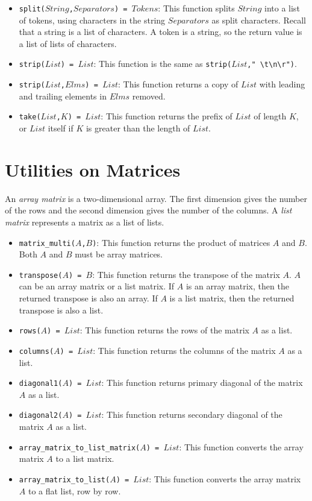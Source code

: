 \begin{itemize}
\item \texttt{split($String$,$Separators$) = $Tokens$}: This function splits $String$ into a list of tokens, using characters in the string $Separators$ as split characters. Recall that a string is a list of characters. A token is a string, so the return value is a list of lists of characters.
\item \texttt{strip($List$) = $List$}: This function is the same as \texttt{strip($List$,}\verb+" \t\n\r")+. 
\item \texttt{strip($List$,$Elms$) = $List$}: This function returns a copy of $List$ with leading and trailing elements in $Elms$ removed.
\item \texttt{take($List$,$K$) = $List$}: This function returns the prefix of $List$ of length $K$, or $List$ itself if $K$ is greater than the length of $List$.
\end{itemize}

\section{Utilities on Matrices}
An {\it array matrix} is a two-dimensional array. The first dimension gives the number of the rows and the second dimension gives the number of the columns. A {\it list matrix} represents a matrix as a list of lists.

\begin{itemize}
\item \texttt{matrix\_multi($A$,$B$)}: This function returns the product of matrices $A$ and $B$. Both $A$ and $B$ must be array matrices.
\item \texttt{transpose($A$) = $B$}: This function returns the transpose of the matrix $A$. $A$ can be an array matrix or a list matrix. If $A$ is an array matrix, then the returned transpose is also an array. If $A$ is a list matrix, then the returned transpose is also a list.
\item \texttt{rows($A$) = $List$}: This function returns the rows of the matrix $A$ as a list.
\item \texttt{columns($A$) = $List$}: This function returns the columns of the matrix $A$ as a list.
\item \texttt{diagonal1($A$) = $List$}: This function returns primary diagonal of the matrix $A$ as a list.
\item \texttt{diagonal2($A$) = $List$}: This function returns secondary diagonal of the matrix $A$ as a list.
\item \texttt{array\_matrix\_to\_list\_matrix($A$) = $List$}: This function converts the array matrix $A$ to a list matrix.
\item \texttt{array\_matrix\_to\_list($A$) = $List$}: This function converts the array matrix $A$ to a flat list, row by row.
\end{itemize}


